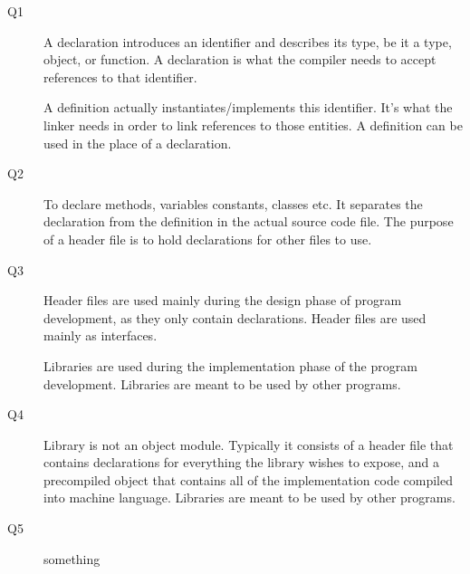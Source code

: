 \documentclass[a4paper]{article}
\begin{document}
\begin{description}
	\item[Q1]\-
	A declaration introduces an identifier and describes its type, be it a type, object, or function. A declaration is what the compiler needs to accept references to that identifier.
	
	A definition actually instantiates/implements this identifier. It's what the linker needs in order to link references to those entities. A definition can be used in the place of a declaration.
	\item[Q2]\-
	To declare methods, variables constants, classes etc. It separates the declaration from the definition in the actual source code file. The purpose of a header file is to hold declarations for other files to use.
	\item[Q3]\-
	Header files are used mainly during the design phase of program development, as they only contain declarations. Header files are used mainly as interfaces.

	Libraries are used during the implementation phase of the program development. Libraries are meant to be used by other programs. 
	\item[Q4]\-
	Library is not an object module. Typically it consists of a header file that contains declarations for everything the library wishes to expose, and a precompiled object that contains all of the implementation code compiled into machine language. Libraries are meant to be used by other programs.
	\item[Q5]\-
	something
\end{description}
\end{document}
